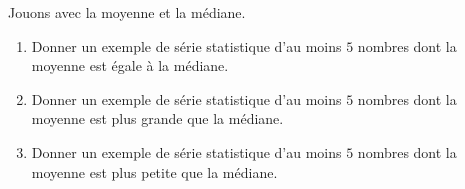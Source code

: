 
\begin{exercice}\label{exoSeconde-0029}

    Jouons avec la moyenne et la médiane.
    \begin{enumerate}
        \item
Donner un exemple de série statistique d'au moins \( 5\) nombres dont la moyenne est égale à la médiane.
\item
    Donner un exemple de série statistique d'au moins \( 5\) nombres dont la moyenne est plus grande que la médiane.
\item
    Donner un exemple de série statistique d'au moins \( 5\) nombres dont la moyenne est plus petite que la médiane.
    \end{enumerate}

\end{exercice}
